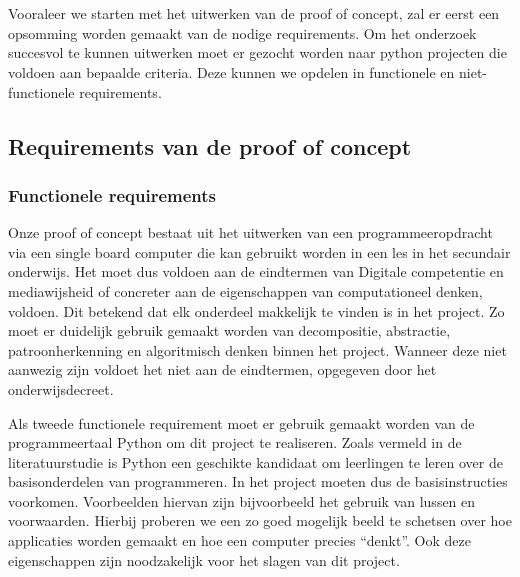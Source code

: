 
\chapter{}
\label{ch:methodologie}


Vooraleer we starten met het uitwerken van de proof of concept, zal er eerst een opsomming worden gemaakt van de nodige requirements. Om het onderzoek succesvol te kunnen uitwerken moet er gezocht worden naar python projecten die voldoen aan bepaalde criteria. 
Deze kunnen we opdelen in functionele en niet-functionele requirements.

\section{Requirements van de proof of concept}

\subsection{Functionele requirements}

Onze proof of concept bestaat uit het uitwerken van een programmeeropdracht via een single board computer die kan gebruikt worden in een les in het secundair onderwijs. Het moet dus voldoen aan de eindtermen van Digitale competentie en mediawijsheid of concreter aan de eigenschappen van computationeel denken, voldoen. Dit betekend dat elk onderdeel makkelijk te vinden is in het project. Zo moet er duidelijk gebruik gemaakt worden van decompositie, abstractie, patroonherkenning en algoritmisch denken binnen het project. Wanneer deze niet aanwezig zijn voldoet het niet aan de eindtermen, opgegeven door het onderwijsdecreet. 

Als tweede functionele requirement moet er gebruik gemaakt worden van de programmeertaal Python om dit project te realiseren. Zoals vermeld in de literatuurstudie is Python een geschikte kandidaat om leerlingen te leren over de basisonderdelen van programmeren. In het project moeten dus de basisinstructies voorkomen. Voorbeelden hiervan zijn bijvoorbeeld het gebruik van lussen en voorwaarden. Hierbij proberen we een zo goed mogelijk beeld te schetsen over hoe applicaties worden gemaakt en hoe een computer precies “denkt”. Ook deze eigenschappen zijn noodzakelijk voor het slagen van dit project.

